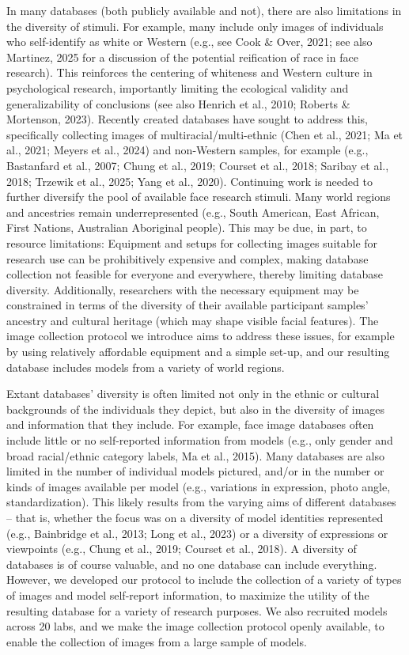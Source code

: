 \documentclass[
  letterpaper,
  DIV=11,
  numbers=noendperiod]{scrartcl}
\begin{document}
In many databases (both publicly available and not), there are also
limitations in the diversity of stimuli. For example, many include only
images of individuals who self-identify as white or Western (e.g., see
Cook \& Over, 2021; see also Martinez, 2025 for a discussion of the
potential reification of race in face research). This reinforces the
centering of whiteness and Western culture in psychological research,
importantly limiting the ecological validity and generalizability of
conclusions (see also Henrich et al., 2010; Roberts \& Mortenson, 2023).
Recently created databases have sought to address this, specifically
collecting images of multiracial/multi-ethnic (Chen et al., 2021; Ma et
al., 2021; Meyers et al., 2024) and non-Western samples, for example
(e.g., Bastanfard et al., 2007; Chung et al., 2019; Courset et al.,
2018; Saribay et al., 2018; Trzewik et al., 2025; Yang et al., 2020).
Continuing work is needed to further diversify the pool of available
face research stimuli. Many world regions and ancestries remain
underrepresented (e.g., South American, East African, First Nations,
Australian Aboriginal people). This may be due, in part, to resource
limitations: Equipment and setups for collecting images suitable for
research use can be prohibitively expensive and complex, making database
collection not feasible for everyone and everywhere, thereby limiting
database diversity. Additionally, researchers with the necessary
equipment may be constrained in terms of the diversity of their
available participant samples' ancestry and cultural heritage (which may
shape visible facial features). The image collection protocol we
introduce aims to address these issues, for example by using relatively
affordable equipment and a simple set-up, and our resulting database
includes models from a variety of world regions.

Extant databases' diversity is often limited not only in the ethnic or
cultural backgrounds of the individuals they depict, but also in the
diversity of images and information that they include. For example, face
image databases often include little or no self-reported information
from models (e.g., only gender and broad racial/ethnic category labels,
Ma et al., 2015). Many databases are also limited in the number of
individual models pictured, and/or in the number or kinds of images
available per model (e.g., variations in expression, photo angle,
standardization). This likely results from the varying aims of different
databases -- that is, whether the focus was on a diversity of model
identities represented (e.g., Bainbridge et al., 2013; Long et al.,
2023) or a diversity of expressions or viewpoints (e.g., Chung et al.,
2019; Courset et al., 2018). A diversity of databases is of course
valuable, and no one database can include everything. However, we
developed our protocol to include the collection of a variety of types
of images and model self-report information, to maximize the utility of
the resulting database for a variety of research purposes. We also
recruited models across 20 labs, and we make the image collection
protocol openly available, to enable the collection of images from a
large sample of models.
\end{document}
